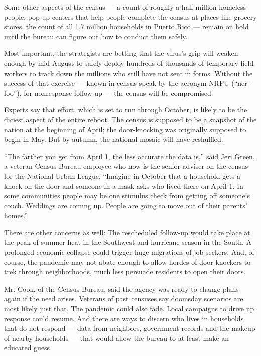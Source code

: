 Some other aspects of the census --- a count of roughly a half-million
homeless people, pop-up centers that help people complete the census at
places like grocery stores, the count of all 1.7 million households in
Puerto Rico --- remain on hold until the bureau can figure out how to
conduct them safely.

Most important, the strategists are betting that the virus's grip will
weaken enough by mid-August to safely deploy hundreds of thousands of
temporary field workers to track down the millions who still have not
sent in forms. Without the success of that exercise --- known in
census-speak by the acronym NRFU (``ner-foo''), for nonresponse
follow-up --- the census will be compromised.

Experts say that effort, which is set to run through October, is likely
to be the diciest aspect of the entire reboot. The census is supposed to
be a snapshot of the nation at the beginning of April; the door-knocking
was originally supposed to begin in May. But by autumn, the national
mosaic will have reshuffled.

``The farther you get from April 1, the less accurate the data is,''
said Jeri Green, a veteran Census Bureau employee who now is the senior
adviser on the census for the National Urban League. ``Imagine in
October that a household gets a knock on the door and someone in a mask
asks who lived there on April 1. In some communities people may be one
stimulus check from getting off someone's couch. Weddings are coming up.
People are going to move out of their parents' homes.''

There are other concerns as well: The rescheduled follow-up would take
place at the peak of summer heat in the Southwest and hurricane season
in the South. A prolonged economic collapse could trigger huge
migrations of job-seekers. And, of course, the pandemic may not abate
enough to allow hordes of door-knockers to trek through neighborhoods,
much less persuade residents to open their doors.

Mr. Cook, of the Census Bureau, said the agency was ready to change
plans again if the need arises. Veterans of past censuses say doomsday
scenarios are most likely just that. The pandemic could also fade. Local
campaigns to drive up response could resume. And there are ways to
discern who lives in households that do not respond --- data from
neighbors, government records and the makeup of nearby households ---
that would allow the bureau to at least make an educated guess.

